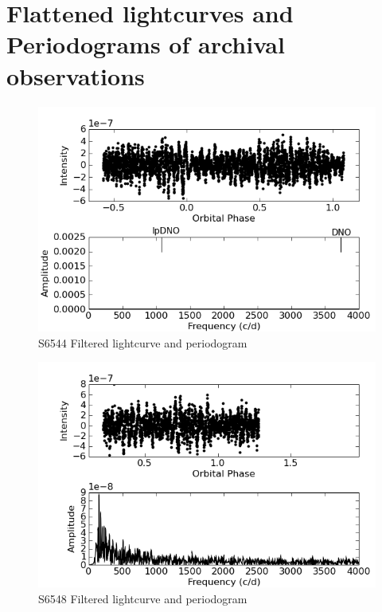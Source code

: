 \chapter{Flattened lightcurves and Periodograms of archival observations}
\label{archive_obs}


\begin{figure}
 \centering
 \includegraphics[bb=0 0 600 400,width=0.85\columnwidth]{images/archive_phot/S6544/S6544_c_FF.png}
 \caption{S6544 Filtered lightcurve and periodogram}
 \label{S6544_c_FF}
\end{figure}


\begin{figure}
 \centering
 \includegraphics[bb=0 0 600 400,width=0.85\columnwidth]{images/archive_phot/S6548/S6548d_c_FF.png}
 \caption{S6548 Filtered lightcurve and periodogram}
 \label{S6548_c_FF}
\end{figure}


